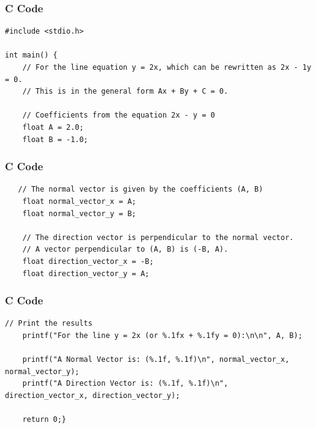 \documentclass{beamer}
\begin{document}
\begin{frame}[fragile]
\frametitle{C Code}
\begin{lstlisting}
#include <stdio.h>

int main() {
    // For the line equation y = 2x, which can be rewritten as 2x - 1y = 0.
    // This is in the general form Ax + By + C = 0.
    
    // Coefficients from the equation 2x - y = 0
    float A = 2.0;
    float B = -1.0;
\end{lstlisting}

\end{frame}

\begin{frame}[fragile]
\frametitle{C Code}
\begin{lstlisting}
   // The normal vector is given by the coefficients (A, B)
    float normal_vector_x = A;
    float normal_vector_y = B;
    
    // The direction vector is perpendicular to the normal vector.
    // A vector perpendicular to (A, B) is (-B, A).
    float direction_vector_x = -B;
    float direction_vector_y = A;

\end{lstlisting}

\end{frame}

\begin{frame}[fragile]
\frametitle{C Code}
\begin{lstlisting}
// Print the results
    printf("For the line y = 2x (or %.1fx + %.1fy = 0):\n\n", A, B);
    
    printf("A Normal Vector is: (%.1f, %.1f)\n", normal_vector_x, normal_vector_y);
    printf("A Direction Vector is: (%.1f, %.1f)\n", direction_vector_x, direction_vector_y);
    
    return 0;}
\end{lstlisting}

\end{frame}
\end{document}
